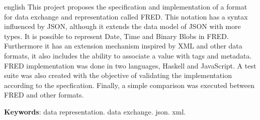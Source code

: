 \begin{resumo}[Abstract]
 \begin{otherlanguage*}{english}
   This project proposes the specification and implementation of a format
   for data exchange and representation called FRED. This notation
   has a syntax influenced by JSON, although it extends the data model of 
   JSON with more types. It is possible to represent Date, 
   Time and Binary Blobs in FRED. Furthermore it has an extension mechanism 
   inspired by XML and other data formats, it also includes the ability 
   to associate a value with tags and metadata.
   FRED implementation was done in two languages, Haskell and JavaScript.
   A test suite was also created with the objective of validating the implementation
   according to the specfication. Finally, a simple comparison was executed
   between FRED and other formats.

   \vspace{\onelineskip}
 
   \noindent 
   \textbf{Keywords}: data representation. data exchange. json. xml.
 \end{otherlanguage*}
\end{resumo}
